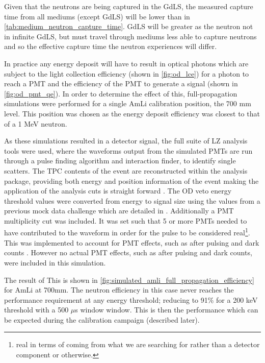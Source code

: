 Given that the neutrons are being captured in the GdLS, the measured capture time from all mediums (except GdLS) will be lower than in \autoref{tab:medium_neutron_capture_time}. 
GdLS will be greater as the neutron not in infinite GdLS, but must travel through mediums less able to capture neutrons and so the effective capture time the neutron experiences will differ.





\par
In practice any energy deposit will have to result in optical photons which are subject to the light collection efficiency (shown in \autoref{fig:od_lce}) for a photon to reach a PMT and the efficiency of the PMT to generate a signal (shown in \autoref{fig:od_pmt_qe}).
In order to determine the effect of this, full-propagation simulations were performed for a single AmLi calibration position, the 700 mm level.
This position was chosen as the energy deposit efficiency was closest to that of a 1 MeV neutron.

\par
As these simulations resulted in a detector signal, the full suite of LZ analysis tools were used, where the waveforms output from the simulated PMTs are run through a pulse finding algorithm and interaction finder, to identify single scatters.
The TPC contents of the event are reconstructed within the analysis package, providing both energy and position information of the event making the application of the analysis cuts is straight forward \cite{lz_simulations_ref}.
The OD veto energy threshold values were converted from energy to signal size using the values from a previous mock data challenge which are detailed in \cite{jonathannikoleyczik_thesis_ref}.
Additionally a PMT multiplicity cut was included.
It was set such that 5 or more PMTs needed to have contributed to the waveform in order for the pulse to be considered real\footnote{real in terms of coming from what we are searching for rather than a detector component or otherwise.}.
This was implemented to account for PMT effects, such as after pulsing and dark counts \cite{jonathannikoleyczik_thesis_ref}.
However no actual PMT effects, such as after pulsing and dark counts, were included in this simulation.

\par
The result of This is shown in \autoref{fig:simulated_amli_full_propagation_efficiency} for AmLi at 700mm. 
The neutron efficiency in this case never reaches the performance requirement at any energy threshold; reducing to 91\% for a 200 keV threshold with a 500 $\mu$s window window.
This is then the performance which can be expected during the calibration campaign (described later).

